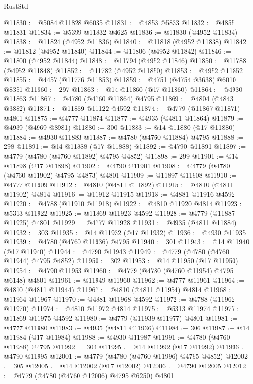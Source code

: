 \begin{lexlean}{RustStd}
\begin{coremodule}
@11830 := @5084 @11828 @6035
@11831 := @4853 @5833
@11832 := @4855 @11831
@11834 := @5399 @11832 @4625
@11836 := @11830 (@4952 @11834)
@11838 := @11824 (@4952 @11836)
@11840 := @11818 (@4952 @11838)
@11842 := @11812 (@4952 @11840)
@11844 := @11806 (@4952 @11842)
@11846 := @11800 (@4952 @11844)
@11848 := @11794 (@4952 @11846)
@11850 := @11788 (@4952 @11848)
@11852 := @11782 (@4952 @11850)
@11853 := @4952 @11852
@11855 := @4457 (@11776 @11853)
@11859 := @4751 (@4754 @3638) @6010 @8351
@11860 := 297
@11863 := @14 @11860 (@17 @11860)
@11864 := @4930 @11863
@11867 := @4780 (@4760 @11864) @4795
@11869 := @4804 (@4843 @3882)
@11871 := @11869 @11122 @4592
@11874 := @4779 (@11867 @11871) @4801
@11875 := @4777 @11874
@11877 := @4935 (@4811 @11864)
@11879 := @4939 (@4969 @8981)
@11880 := 300
@11883 := @14 @11880 (@17 @11880)
@11884 := @4930 @11883
@11887 := @4780 (@4760 @11884) @4795
@11888 := 298
@11891 := @14 @11888 (@17 @11888)
@11892 := @4790 @11891
@11897 := @4779 (@4780 (@4760 @11892) @4795 @4852)
@11898 := 299
@11901 := @14 @11898 (@17 @11898)
@11902 := @4790 @11901
@11908 := @4779 (@4780 (@4760 @11902) @4795 @4873) @4801
@11909 := @11897 @11908
@11910 := @4777 @11909
@11912 := @4810 (@4811 @11892)
@11915 := @4810 (@4811 @11902) @4814
@11916 := @11912 @11915
@11918 := @4881 @11916 @4592
@11920 := @4788 (@11910 @11918)
@11922 := @4810 @11920 @4814
@11923 := @5313 @11922
@11925 := @11869 @11923 @4592
@11928 := @4779 (@11887 @11925) @4801
@11929 := @4777 @11928
@11931 := @4935 (@4811 @11884)
@11932 := 303
@11935 := @14 @11932 (@17 @11932)
@11936 := @4930 @11935
@11939 := @4780 (@4760 @11936) @4795
@11940 := 301
@11943 := @14 @11940 (@17 @11940)
@11944 := @4790 @11943
@11949 := @4779 (@4780 (@4760 @11944) @4795 @4852)
@11950 := 302
@11953 := @14 @11950 (@17 @11950)
@11954 := @4790 @11953
@11960 := @4779 (@4780 (@4760 @11954) @4795 @6148) @4801
@11961 := @11949 @11960
@11962 := @4777 @11961
@11964 := @4810 (@4811 @11944)
@11967 := @4810 (@4811 @11954) @4814
@11968 := @11964 @11967
@11970 := @4881 @11968 @4592
@11972 := @4788 (@11962 @11970)
@11974 := @4810 @11972 @4814
@11975 := @5313 @11974
@11977 := @11869 @11975 @4592
@11980 := @4779 (@11939 @11977) @4801
@11981 := @4777 @11980
@11983 := @4935 (@4811 @11936)
@11984 := 306
@11987 := @14 @11984 (@17 @11984)
@11988 := @4930 @11987
@11991 := @4780 (@4760 @11988) @4795
@11992 := 304
@11995 := @14 @11992 (@17 @11992)
@11996 := @4790 @11995
@12001 := @4779 (@4780 (@4760 @11996) @4795 @4852)
@12002 := 305
@12005 := @14 @12002 (@17 @12002)
@12006 := @4790 @12005
@12012 := @4779 (@4780 (@4760 @12006) @4795 @6250) @4801

\end{coremodule}
\end{lexlean}

